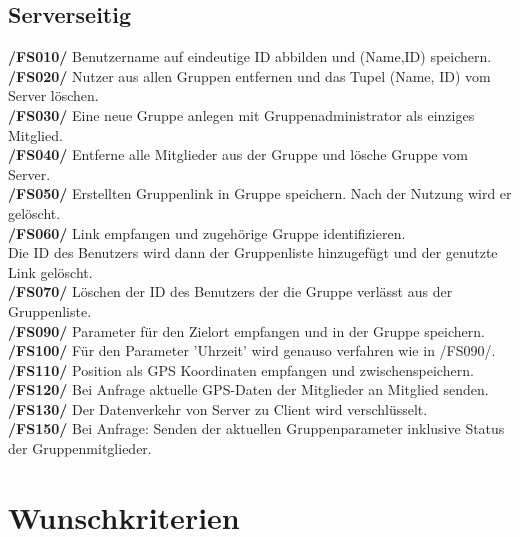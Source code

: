 \subsection{Serverseitig}
     \textbf{/FS010/} Benutzername auf eindeutige ID abbilden und (Name,ID) speichern.\\
     \textbf{/FS020/} Nutzer aus allen Gruppen entfernen und das Tupel (Name, ID) vom Server löschen.\\
     \textbf{/FS030/} Eine neue Gruppe anlegen mit Gruppenadministrator als einziges Mitglied.\\
     \textbf{/FS040/} Entferne alle Mitglieder aus der Gruppe und lösche Gruppe vom Server.\\
     \textbf{/FS050/} Erstellten Gruppenlink in Gruppe speichern. Nach der Nutzung wird er gelöscht.\\
     \textbf{/FS060/} Link empfangen und zugehörige Gruppe identifizieren.\\ Die ID des Benutzers wird dann der Gruppenliste hinzugefügt und der genutzte Link gelöscht.\\
     \textbf{/FS070/} Löschen der ID des Benutzers der die Gruppe verlässt aus der Gruppenliste.\\
     \textbf{/FS090/} Parameter für den Zielort empfangen und in der Gruppe speichern.\\
     \textbf{/FS100/} Für den Parameter 'Uhrzeit' wird genauso verfahren wie in /FS090/. \\
     \textbf{/FS110/} Position als GPS Koordinaten empfangen und zwischenspeichern.\\
     \textbf{/FS120/} Bei Anfrage aktuelle GPS-Daten der Mitglieder an Mitglied senden.\\
     \textbf{/FS130/} Der Datenverkehr von Server zu Client wird verschlüsselt.\\
     \textbf{/FS150/} Bei Anfrage: Senden der aktuellen Gruppenparameter inklusive Status der Gruppenmitglieder.\\
\section{Wunschkriterien}
